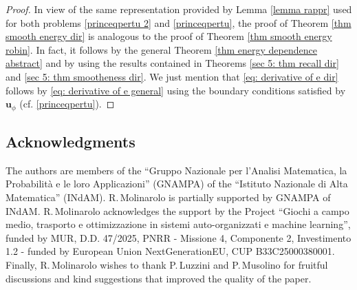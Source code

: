 \documentclass[11pt,reqno,a4paper]{amsart}
\theoremstyle{plain}
\theoremstyle{definition}
\begin{document}
\begin{proof}
    In view of the same representation provided by Lemma \ref{lemma rappr} used for both problems \eqref{princeqpertu 2} and \eqref{princeqpertu}, the proof of Theorem \ref{thm smooth energy dir} is analogous to the proof of Theorem \ref{thm smooth energy robin}. In fact, it follows by the general Theorem \ref{thm energy dependence abstract} and by using the results contained in Theorems \ref{sec 5: thm recall dir} and \ref{sec 5: thm smootheness dir}. We just mention that \eqref{eq: derivative of e dir} follows by \eqref{eq: derivative of e general} using the boundary conditions satisfied by $\mathbf{u}_\phi$ (cf. \eqref{princeqpertu}).
\end{proof}

\subsection*{Acknowledgments}

The authors are members of the ``Gruppo Nazionale per l'Analisi Matematica, la Probabilit\`a e le loro Applicazioni'' (GNAMPA) of the ``Istituto Nazionale di Alta Matematica'' (INdAM). R.\,Molinarolo is partially supported by GNAMPA of INdAM. R.\,Molinarolo acknowledges the support by the Project ``Giochi a campo medio, trasporto e ottimizzazione in sistemi auto-organizzati e machine learning'', funded by MUR, D.D. 47/2025, PNRR - Missione 4, Componente 2, Investimento 1.2 - funded by European Union NextGenerationEU, CUP B33C25000380001.
Finally, R.\,Molinarolo wishes to thank P.\,Luzzini and P.\,Musolino for fruitful discussions and kind suggestions that improved the quality of the paper. 



\end{document}
